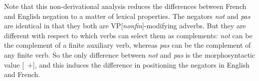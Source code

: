 \documentclass[output=paper
	        ,collection
	        ,collectionchapter
 	        ,biblatex
                ,babelshorthands
                ,newtxmath
                ,draftmode
                ,colorlinks, citecolor=brown
]{langscibook}
\begin{document}
{\begin{exe}
\begin{xlist}
\begin{exe}
\begin{xlist}
\eal
{}
\zl

\eal
{}
\zl

Note that this non-derivational analysis reduces the differences between
French and English negation to a matter of lexical properties.
The negators \textit{not} and \textit{pas} are identical in that they both are
VP[\textit{nonfin}]-modifying adverbs. But they are different with respect to
which verbs can select them as complements:  \textit{not} can be the
complement of a finite auxiliary verb, whereas \textit{pas} can be the
complement of any finite verb.  So the only difference between \emph{not}
and \emph{pas} is the morphosyntactic value [\AUX\ $+$], and this induces
the difference in positioning the negators in English and French.



%





\end{xlist}
\end{exe}
\end{xlist}
\end{exe}}
\end{document}
